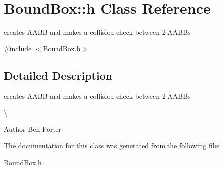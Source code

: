 \hypertarget{class_bound_box_1_1h}{}\section{Bound\+Box\+:\+:h Class Reference}
\label{class_bound_box_1_1h}


creates A\+A\+B\+B and makes a collision check between 2 A\+A\+B\+Bs  




{\ttfamily \#include $<$Bound\+Box.\+h$>$}



\subsection{Detailed Description}
creates A\+A\+B\+B and makes a collision check between 2 A\+A\+B\+Bs 

\textbackslash{}

\begin{DoxyAuthor}{Author}
Ben Porter 
\end{DoxyAuthor}


The documentation for this class was generated from the following file\+:\begin{DoxyCompactItemize}
\item 
\hyperlink{_bound_box_8h}{Bound\+Box.\+h}\end{DoxyCompactItemize}
